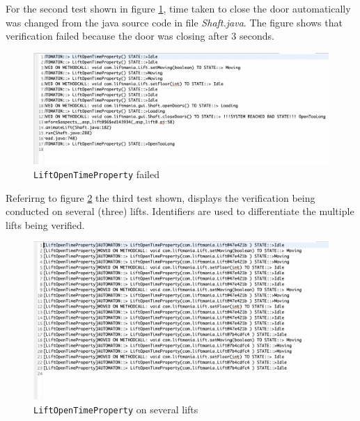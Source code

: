 \documentclass[a4paper, 12pt]{article}
\begin{document}
For the second test shown in figure \ref{fig:lift-open-test-failed}, time taken to close the door automatically was changed from the java source code in file \textit{Shaft.java}. The figure shows that verification failed because the door was closing after 3 seconds. \\

\begin{figure}[h]
   \centering
   \includegraphics[width=\textwidth,height=\textheight,keepaspectratio]{images/lift-open-test-failed} %
   \caption{\texttt{LiftOpenTimeProperty} failed}
   \label{fig:lift-open-test-failed}
\end{figure}

Referirng to figure \ref{fig:lift-open-test-multiple} the third test shown, displays the verification being conducted on several (three) lifts. Identifiers are used to differentiate the multiple lifts being verified. \\

\begin{figure}[h]
   \centering
   \includegraphics[width=\textwidth,height=\textheight,keepaspectratio]{images/lift-open-test-multiple} %
   \caption{\texttt{LiftOpenTimeProperty} on several lifts}
   \label{fig:lift-open-test-multiple}
\end{figure}
\end{document}
